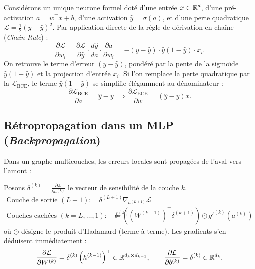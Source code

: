 Considérons un unique neurone formel doté d'une entrée $x \in \mathbb{R}^d$, d'une pré-activation $a = w^\top x + b$, d'une activation $\hat{y} = \sigma(a)$, et d'une perte quadratique $\mathcal{L} = \frac{1}{2}(y - \hat{y})^2$. Par application directe de la règle de dérivation en chaîne (\emph{Chain Rule}) :
\begin{equation}
    \frac{\partial \mathcal{L}}{\partial w_i} = \frac{\partial \mathcal{L}}{\partial \hat{y}} \cdot \frac{d\hat{y}}{da} \cdot \frac{\partial a}{\partial w_i} = - (y - \hat{y}) \cdot \hat{y}(1 - \hat{y}) \cdot x_i.
\end{equation}
On retrouve le terme d'erreur $(y - \hat{y})$, pondéré par la pente de la sigmoïde $\hat{y}(1 - \hat{y})$ et la projection d'entrée $x_i$. Si l'on remplace la perte quadratique par la $\mathcal{L}_{\mathrm{BCE}}$, le terme $\hat{y}(1-\hat{y})$ se simplifie élégamment au dénominateur :
\begin{equation}
    \frac{\partial \mathcal{L}_{\mathrm{BCE}}}{\partial a} = \hat{y} - y \implies \frac{\partial \mathcal{L}_{\mathrm{BCE}}}{\partial w} = (\hat{y} - y)x.
\end{equation}

\subsection{Rétropropagation dans un MLP (\emph{Backpropagation})}


Dans un graphe multicouches, les erreurs locales sont propagées de l'aval vers l'amont :
\begin{definition}
    Posons $\delta^{(k)} = \frac{\partial \mathcal{L}}{\partial a^{(k)}}$ le vecteur de sensibilité de la couche $k$.
    \begin{align}
        \text{Couche de sortie } (L+1) : \quad \delta^{(L+1)} &= \nabla_{a^{(L+1)}} \mathcal{L} \\
        \text{Couches cachées } (k = L, \dots, 1) : \quad \delta^{(k)} &= \left( (W^{(k+1)})^\top \delta^{(k+1)} \right) \odot g'^{(k)}\left(a^{(k)}\right)
    \end{align}
    où $\odot$ désigne le produit d'Hadamard (terme à terme). Les gradients s'en déduisent immédiatement :
    \begin{equation}
        \frac{\partial \mathcal{L}}{\partial W^{(k)}} = \delta^{(k)} \left(h^{(k-1)}\right)^\top \in \mathbb{R}^{d_k \times d_{k-1}}, \qquad \frac{\partial \mathcal{L}}{\partial b^{(k)}} = \delta^{(k)} \in \mathbb{R}^{d_k}.
    \end{equation}
\end{definition}

